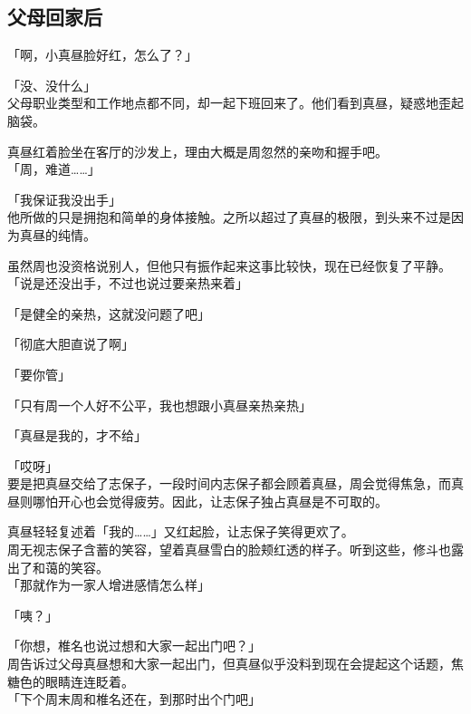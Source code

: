 \subsection{父母回家后}

「啊，小真昼脸好红，怎么了？」

「没、没什么」\\

父母职业类型和工作地点都不同，却一起下班回来了。他们看到真昼，疑惑地歪起脑袋。

真昼红着脸坐在客厅的沙发上，理由大概是周忽然的亲吻和握手吧。\\

「周，难道……」

「我保证我没出手」\\

他所做的只是拥抱和简单的身体接触。之所以超过了真昼的极限，到头来不过是因为真昼的纯情。

虽然周也没资格说别人，但他只有振作起来这事比较快，现在已经恢复了平静。\\

「说是还没出手，不过也说过要亲热来着」

「是健全的亲热，这就没问题了吧」

「彻底大胆直说了啊」

「要你管」

「只有周一个人好不公平，我也想跟小真昼亲热亲热」

「真昼是我的，才不给」

「哎呀」\\

要是把真昼交给了志保子，一段时间内志保子都会顾着真昼，周会觉得焦急，而真昼则哪怕开心也会觉得疲劳。因此，让志保子独占真昼是不可取的。

真昼轻轻复述着「我的……」又红起脸，让志保子笑得更欢了。\\

周无视志保子含蓄的笑容，望着真昼雪白的脸颊红透的样子。听到这些，修斗也露出了和蔼的笑容。\\

「那就作为一家人增进感情怎么样」

「咦？」

「你想，椎名也说过想和大家一起出门吧？」\\

周告诉过父母真昼想和大家一起出门，但真昼似乎没料到现在会提起这个话题，焦糖色的眼睛连连眨着。\\

「下个周末周和椎名还在，到那时出个门吧」

